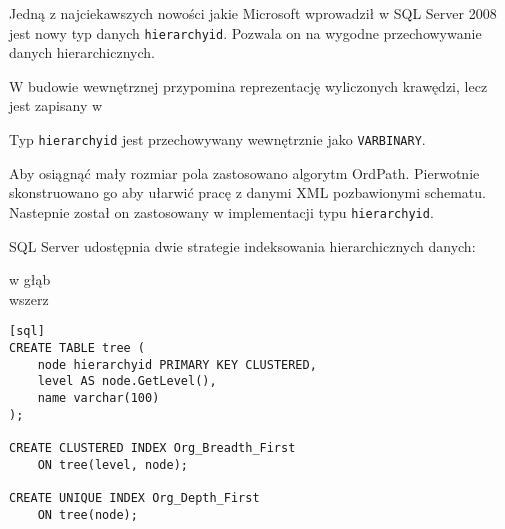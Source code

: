 Jedną z najciekawszych nowości jakie Microsoft wprowadził w SQL Server 2008 jest nowy typ danych \texttt{hierarchyid}.
Pozwala on na wygodne przechowywanie danych hierarchicznych.

W budowie wewnętrznej przypomina reprezentację wyliczonych krawędzi, lecz jest zapisany w




Typ \texttt{hierarchyid} jest przechowywany wewnętrznie jako \texttt{VARBINARY}.


Aby osiągnąć mały rozmiar pola zastosowano algorytm OrdPath\cite{ordpath,kumaran}.
Pierwotnie  skonstruowano go aby ułarwić pracę z danymi XML pozbawionymi schematu.
Nastepnie został on zastosowany w implementacji typu \texttt{hierarchyid}.






SQL Server udostępnia dwie strategie indeksowania hierarchicznych danych:
\begin{description}
 \item[w głąb]  
 \item[wszerz]  
 \end{description}



\begin{verbatim}[sql]
CREATE TABLE tree (
    node hierarchyid PRIMARY KEY CLUSTERED,
    level AS node.GetLevel(),
    name varchar(100)
);

CREATE CLUSTERED INDEX Org_Breadth_First
    ON tree(level, node);

CREATE UNIQUE INDEX Org_Depth_First
    ON tree(node);
\end{verbatim}



